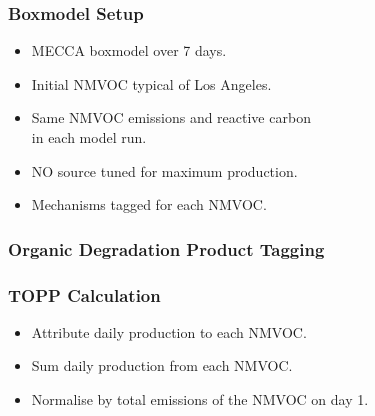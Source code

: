 \begin{frame}
    \frametitle{Boxmodel Setup}

    \vspace{-0.5cm}
    \begin{itemize}
        \item MECCA boxmodel over 7 days. \vspace{3mm}
        \item Initial NMVOC typical of Los Angeles. \vspace{3mm}
        \item Same NMVOC emissions and reactive carbon \\in each model run. \vspace{3mm}
        \item NO source tuned for maximum  production. \vspace{3mm}
        \item Mechanisms tagged for each NMVOC.
    \end{itemize}
\end{frame}

\begin{frame}
    \frametitle{Organic Degradation Product Tagging}
    \vspace{-1.0cm}
    \begin{center}
        
    \end{center}
\end{frame}

{
    \begin{frame}[plain]
    \end{frame}
}

\begin{frame}
    \frametitle{TOPP Calculation}

    \begin{itemize}
        \item Attribute daily  production to each NMVOC. \vspace{5mm}
        \item Sum daily  production from each NMVOC. \vspace{5mm}
        \item Normalise by total emissions of the NMVOC on day 1. \vspace{5mm}
    \end{itemize}
\end{frame}

